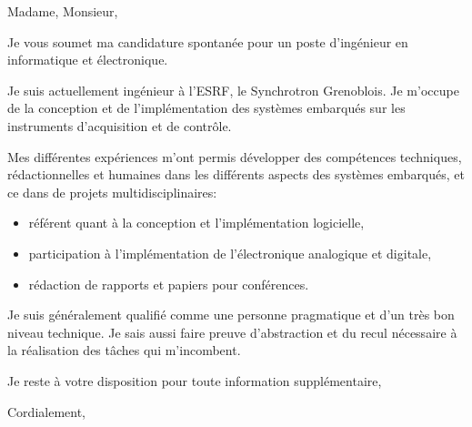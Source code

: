 \documentclass[11pt]{letter} %
\begin{document}
\signature{Le Mentec Fabien}               %
\longindentation=0pt                       %
\let\raggedleft\raggedright                %
 
\begin{letter}{}
\vfill %

\opening{Madame, Monsieur,} 

\noindent
Je vous soumet ma candidature spontan\'{e}e pour un poste d'ing\'{e}nieur en
informatique et \'{e}lectronique.

\noindent
Je suis actuellement ing\'{e}nieur \`{a} l'ESRF, le Synchrotron Grenoblois. Je m'occupe de la conception et de l'impl\'{e}mentation des syst\`{e}mes embarqu\'{e}s sur les instruments d'acquisition et de contr\^{o}le.

\noindent
Mes diff\'{e}rentes exp\'{e}riences m'ont permis d\'{e}velopper des comp\'{e}tences
techniques, r\'{e}dactionnelles et humaines dans les diff\'{e}rents aspects des
syst\`{e}mes embarqu\'{e}s, et ce dans de projets multidisciplinaires:
\begin{itemize}
\item r\'{e}f\'{e}rent quant \`{a} la conception et l'impl\'{e}mentation logicielle,
\item participation \`{a} l'impl\'{e}mentation de l'\'{e}lectronique analogique et digitale,
\item r\'{e}daction de rapports et papiers pour conf\'{e}rences.
\end{itemize}

\noindent
Je suis g\'{e}n\'{e}ralement qualifi\'{e} comme une personne pragmatique et d'un
tr\`{e}s bon niveau technique. Je sais aussi faire preuve d'abstraction et du recul
n\'{e}cessaire \`{a} la r\'{e}alisation des t\^{a}ches qui m'incombent.

\noindent
Je reste \`{a} votre disposition pour toute information suppl\'{e}mentaire,

\closing{Cordialement,}

 
\end{letter}
 
\end{document}

